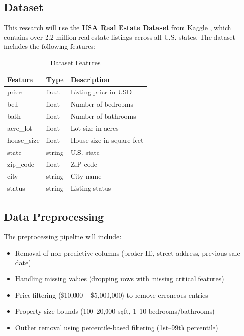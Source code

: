 \documentclass[12pt, a4paper]{article}
\begin{document}
\subsection{Dataset}

This research will use the \textbf{USA Real Estate Dataset} from Kaggle \citep{sakib2023dataset}, which contains over 2.2 million real estate listings across all U.S. states. The dataset includes the following features:

\begin{table}[H]
\centering
\caption{Dataset Features}
\begin{tabular}{lll}
\toprule
\textbf{Feature} & \textbf{Type} & \textbf{Description} \\
\midrule
price & float & Listing price in USD \\
bed & float & Number of bedrooms \\
bath & float & Number of bathrooms \\
acre\_lot & float & Lot size in acres \\
house\_size & float & House size in square feet \\
state & string & U.S. state \\
zip\_code & float & ZIP code \\
city & string & City name \\
status & string & Listing status \\
\bottomrule
\end{tabular}
\end{table}

\subsection{Data Preprocessing}

The preprocessing pipeline will include:
\begin{itemize}
    \item Removal of non-predictive columns (broker ID, street address, previous sale date)
    \item Handling missing values (dropping rows with missing critical features)
    \item Price filtering (\$10,000 -- \$5,000,000) to remove erroneous entries
    \item Property size bounds (100--20,000 sqft, 1--10 bedrooms/bathrooms)
    \item Outlier removal using percentile-based filtering (1st--99th percentile)
\end{itemize}
\end{document}
